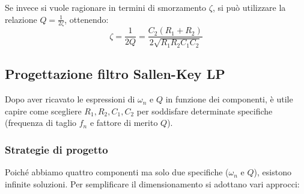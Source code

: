 Se invece si vuole ragionare in termini di smorzamento $\zeta$, si può utilizzare la relazione $Q = \frac{1}{2\zeta}$, ottenendo:
\begin{equation}
    \zeta = \frac{1}{2Q} = \frac{C_2(R_1 + R_2)}{2\sqrt{R_1 R_2 C_1 C_2}}
    \label{eq: Smorzamento LP}
\end{equation}




\subsection{Progettazione filtro Sallen-Key LP}
\label{sec:progetto_lowpass}

Dopo aver ricavato le espressioni di \(\omega_n\) e \(Q\) in funzione dei componenti, è utile capire come scegliere \(R_1,R_2,C_1,C_2\) per soddisfare determinate specifiche (frequenza di taglio \(f_n\) e fattore di merito \(Q\)). 
\subsubsection{Strategie di progetto}
Poiché abbiamo quattro componenti ma solo due specifiche (\(\omega_n\) e \(Q\)), esistono infinite soluzioni. Per semplificare il dimensionamento si adottano vari approcci:

